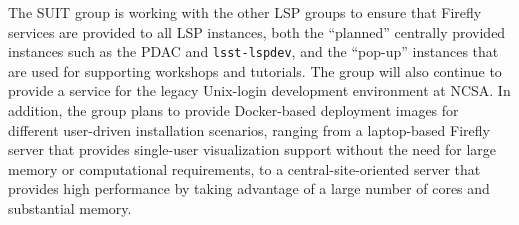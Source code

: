 The SUIT group is working with the other LSP groups to ensure that Firefly services are provided to all LSP instances, both the ``planned'' centrally provided instances such as the PDAC and \verb|lsst-lspdev|, and the ``pop-up'' instances that are used for supporting workshops and tutorials.
The group will also continue to provide a service for the legacy Unix-login development environment at NCSA.
In addition, the group plans to provide Docker-based deployment images for different user-driven installation scenarios, ranging from a laptop-based Firefly server that provides single-user visualization support without the need for large memory or computational requirements, to a central-site-oriented server that provides high performance by taking advantage of a large number of cores and substantial memory.
